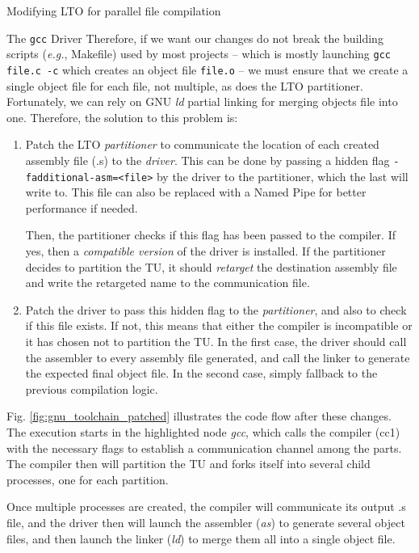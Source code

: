 \begin{section}{Modifying LTO for parallel file compilation}
\begin{subsection}{The \texttt{gcc} Driver}
Therefore, if we want our changes do not break the building scripts
(\textit{e.g.}, Makefile) used by most projects -- which is mostly launching
\texttt{gcc file.c -c} which creates an object file \texttt{file.o} -- we must
ensure that we create a single object file for each file, not multiple, as does
the LTO partitioner. Fortunately, we can rely on GNU \textit{ld} partial linking
for merging objects file into one. Therefore, the solution to this problem is:
\begin{enumerate}
	\item Patch the LTO \textit{partitioner} to communicate the location of
	each created assembly file (.s) to the \textit{driver}. This can be
	done by passing a hidden flag \texttt{-fadditional-asm=<file>}
	by the driver to the partitioner, which the last will write to. This file can also
	be replaced with a Named Pipe for better performance if needed.

	Then, the partitioner checks if this flag has been passed to the compiler.
	If yes, then a \textit{compatible version} of the driver is installed. If
	the partitioner decides to partition the TU, it should \textit{retarget}
	the destination assembly file and write the retargeted name to the
	communication file.

	\item Patch the driver to pass this hidden flag to the
	\textit{partitioner}, and also to check if this file exists. If not, this means
	that either the compiler is incompatible or it has chosen not to partition
	the TU. In the first case, the driver should call the assembler to every
	assembly file generated, and call the linker to generate the expected
	final object file. In the second case, simply fallback to the previous
	compilation logic.
\end{enumerate}

Fig. \ref{fig:gnu_toolchain_patched} illustrates the code flow after these
changes.  The execution starts in the highlighted node \textit{gcc}, which
calls the compiler (cc1) with the necessary flags to establish a communication
channel among the parts. The compiler then will partition the TU and forks
itself into several child processes, one for each partition.

Once multiple processes are created, the compiler will communicate its output
.s file, and the driver then will launch the assembler (\textit{as}) to
generate several object files, and then launch the linker (\textit{ld}) to
merge them all into a single object file.


\end{subsection}
\end{section}
